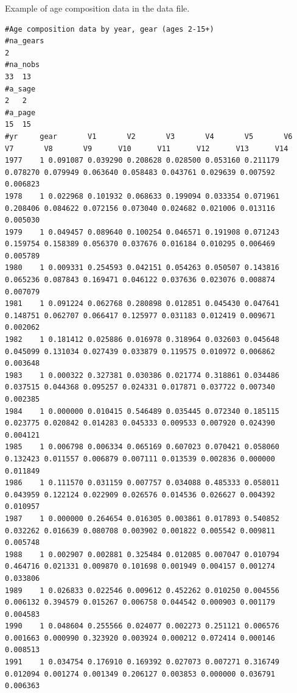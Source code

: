 \begin{landscape}
\begin{table}
\caption{Example of age composition data in the data file.}\label{T1}
\begin{footnotesize}
\begin{verbatim}
#Age composition data by year, gear (ages 2-15+)
#na_gears
2
#na_nobs
33	13
#a_sage
2	2
#a_page
15	15
#yr 	gear       V1       V2       V3       V4       V5       V6       V7       V8       V9      V10      V11      V12      V13      V14
1977    1 0.091087 0.039290 0.208628 0.028500 0.053160 0.211179 0.078270 0.079949 0.063640 0.058483 0.043761 0.029639 0.007592 0.006823
1978    1 0.022968 0.101932 0.068633 0.199094 0.033354 0.071961 0.208406 0.084622 0.072156 0.073040 0.024682 0.021006 0.013116 0.005030
1979    1 0.049457 0.089640 0.100254 0.046571 0.191908 0.071243 0.159754 0.158389 0.056370 0.037676 0.016184 0.010295 0.006469 0.005789
1980    1 0.009331 0.254593 0.042151 0.054263 0.050507 0.143816 0.065236 0.087843 0.169471 0.046122 0.037636 0.023076 0.008874 0.007079
1981    1 0.091224 0.062768 0.280898 0.012851 0.045430 0.047641 0.148751 0.062707 0.066417 0.125977 0.031183 0.012419 0.009671 0.002062
1982    1 0.181412 0.025886 0.016978 0.318964 0.032603 0.045648 0.045099 0.131034 0.027439 0.033879 0.119575 0.010972 0.006862 0.003648
1983    1 0.000322 0.327381 0.030386 0.021774 0.318861 0.034486 0.037515 0.044368 0.095257 0.024331 0.017871 0.037722 0.007340 0.002385
1984    1 0.000000 0.010415 0.546489 0.035445 0.072340 0.185115 0.023775 0.020842 0.014283 0.045333 0.009533 0.007920 0.024390 0.004121
1985    1 0.006798 0.006334 0.065169 0.607023 0.070421 0.058060 0.132423 0.011557 0.006879 0.007111 0.013539 0.002836 0.000000 0.011849
1986    1 0.111570 0.031159 0.007757 0.034088 0.485333 0.058011 0.043959 0.122124 0.022909 0.026576 0.014536 0.026627 0.004392 0.010957
1987    1 0.000000 0.264654 0.016305 0.003861 0.017893 0.540852 0.032262 0.016639 0.080708 0.003902 0.001822 0.005542 0.009811 0.005748
1988    1 0.002907 0.002881 0.325484 0.012085 0.007047 0.010794 0.464716 0.021331 0.009870 0.101698 0.001949 0.004157 0.001274 0.033806
1989    1 0.026833 0.022546 0.009612 0.452262 0.010250 0.004556 0.006132 0.394579 0.015267 0.006758 0.044542 0.000903 0.001179 0.004583
1990    1 0.048604 0.255566 0.024077 0.002273 0.251121 0.006576 0.001663 0.000990 0.323920 0.003924 0.000212 0.072414 0.000146 0.008513
1991    1 0.034754 0.176910 0.169392 0.027073 0.007271 0.316749 0.012094 0.001274 0.001349 0.206127 0.003853 0.000000 0.036791 0.006363

\end{verbatim}
\end{footnotesize}
\end{table}
\end{landscape}
